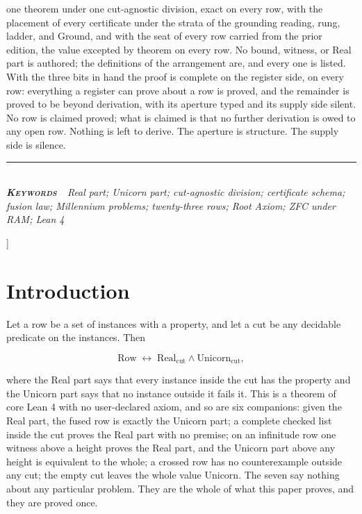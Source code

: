 \documentclass[10pt,twocolumn]{article}
\begin{document}
{\begin{minipage}{\textwidth}
{one theorem under one cut-agnostic division, exact on every row, with
the placement of every certificate under the strata of the grounding
reading, rung, ladder, and Ground, and with the seat of every row
carried from the prior edition, the value excepted by theorem on every
row. No bound, witness, or Real part is authored; the definitions of the
arrangement are, and every one is listed. With the three bits in hand
the proof is complete on the register side, on every row: everything a
register can prove about a row is proved, and the remainder is proved to
be beyond derivation, with its aperture typed and its supply side
silent. No row is claimed proved; what is claimed is that no further
derivation is owed to any open row. Nothing is left to derive. The
aperture is structure. The supply side is silence.}\\[4pt]
{\color{accent}\rule{\textwidth}{0.6pt}}\\[3pt]
{\itshape\footnotesize\color{faint}\textbf{\upshape\scshape\color{deep}Keywords\ }\ Real
part; Unicorn part; cut-agnostic division; certificate schema; fusion
law; Millennium problems; twenty-three rows; Root Axiom; ZFC under RAM;
Lean 4}\\[12pt]
\end{minipage}
}]
\thispagestyle{fancy}
\hypertarget{introduction}{%
\section{Introduction}\label{introduction}}

Let a row be a set of instances with a property, and let a cut be any
decidable predicate on the instances. Then

\[\mathrm{Row} \;\leftrightarrow\; \mathrm{Real}_{\mathrm{cut}} \wedge \mathrm{Unicorn}_{\mathrm{cut}},\]

where the Real part says that every instance inside the cut has the
property and the Unicorn part says that no instance outside it fails it.
This is a theorem of core Lean 4 with no user-declared axiom, and so are
six companions: given the Real part, the fused row is exactly the
Unicorn part; a complete checked list inside the cut proves the Real
part with no premise; on an infinitude row one witness above a height
proves the Real part, and the Unicorn part above any height is
equivalent to the whole; a crossed row has no counterexample outside any
cut; the empty cut leaves the whole value Unicorn. The seven say nothing
about any particular problem. They are the whole of what this paper
proves, and they are proved once.
\end{document}
